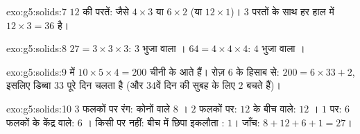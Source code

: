 \begin{solution}{exo:g5:solids:7}
$12$ की परतें: जैसे $4 \times 3$ या $6 \times 2$ (या
$12 \times 1$)। $3$ परतों के साथ हर हाल में 
$12 \times 3 = 36$  है।
\end{solution}

\begin{solution}{exo:g5:solids:8}
$27 = 3 \times 3 \times 3$: $3$ भुजा वाला ।
$64 = 4 \times 4 \times 4$: $4$ भुजा वाला ।
\end{solution}

\begin{solution}{exo:g5:solids:9}
 में $10 \times 5 \times 4 = 200$ चीनी के  आते हैं। रोज़
$6$ के हिसाब से: $200 = 6 \times 33 + 2$, इसलिए डिब्बा $33$ पूरे
दिन चलता है (और $34$वें दिन की सुबह के लिए $2$  बचते हैं)।
\end{solution}

\begin{solution}{exo:g5:solids:10}
$3$ फलकों पर रंग: कोनों वाले $8$ । $2$ फलकों पर: $12$ 
के बीच वाले: $12$ । $1$  पर: $6$ फलकों के केंद्र वाले:
$6$ । किसी पर नहीं: बीच में छिपा इकलौता : $1$।
जाँच: $8 + 12 + 6 + 1 = 27$। \checkmark
\end{solution}

